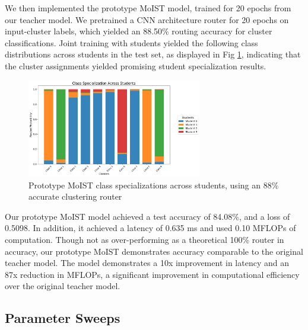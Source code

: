 \documentclass[conference]{IEEEtran}
\begin{document}
We then implemented the prototype MoIST model, trained for 20 epochs from our teacher model. We pretrained a CNN architecture router for 20 epochs on input-cluster labels, which yielded an 88.50\% routing accuracy for cluster classifications. Joint training with students yielded the following class distributions across students in the test set, as displayed in Fig \ref{routerdist}, indicating that the cluster assignments yielded promising student specialization results.

\begin{figure}[ht!] %
\centering
\includegraphics[width=3in]{figures/router_specialization_baseline.png}
\caption{Prototype MoIST class specializations across students, using an 88\% accurate clustering router}
\label{routerdist}
\end{figure}

Our prototype MoIST model achieved a test accuracy of 84.08\%, and a loss of 0.5098. In addition, it achieved a latency of 0.635 ms and used 0.10 MFLOPs of computation. Though not as over-performing as a theoretical 100\% router in accuracy, our prototype MoIST demonstrates accuracy comparable to the original teacher model. The model demonstrates a 10x improvement in latency and an 87x reduction in MFLOPs, a significant improvement in computational efficiency over the original teacher model.

\subsection{Parameter Sweeps}
\end{document}
